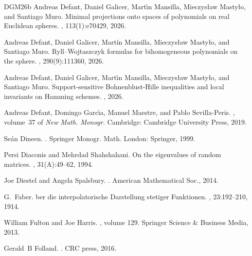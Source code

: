 \documentclass[11pt,showkeys]{amsart}
\begin{document}
\begin{thebibliography}{DGM{\etalchar{+}}26b}
Andreas Defant, Daniel Galicer, Mart{\'\i}n Mansilla, Mieczys{\l}aw Masty{\l}o, and Santiago Muro.
\newblock Minimal projections onto spaces of polynomials on real {E}uclidean spheres.
, 113(1):e70429, 2026.

Andreas Defant, Daniel Galicer, Mart{\'i}n Mansilla, Mieczys{\l}aw Masty{\l}o, and Santiago Muro.
\newblock Ryll--{W}ojtaszczyk formulas for bihomogeneous polynomials on the sphere.
, 290(9):111360, 2026.

Andreas Defant, Daniel Galicer, Mart{\'\i}n Mansilla, Mieczys{\l}aw Masty{\l}o, and Santiago Muro.
\newblock Support-sensitive {Bohnenblust}-{Hille} inequalities and local invariants on {H}amming schemes.
, 2026.

Andreas Defant, Domingo Garc{\'{\i}}a, Manuel Maestre, and Pablo Sevilla-Peris.
, volume~37 of {\em New Math. Monogr.}
\newblock Cambridge: Cambridge University Press, 2019.

Se{\'a}n Dineen.
.
\newblock Springer Monogr. Math. London: Springer, 1999.

Persi Diaconis and Mehrdad Shahshahani.
\newblock On the eigenvalues of random matrices.
, 31(A):49--62, 1994.

Joe Diestel and Angela Spalsbury.
.
\newblock American Mathematical Soc., 2014.

G.~Faber.
ber die interpolatorische {Darstellung} stetiger {Funktionen}.
, 23:192--210, 1914.

William Fulton and Joe Harris.
, volume 129.
\newblock Springer Science \& Business Media, 2013.

Gerald~B Folland.
.
\newblock CRC press, 2016.


\end{thebibliography}
\end{document}
